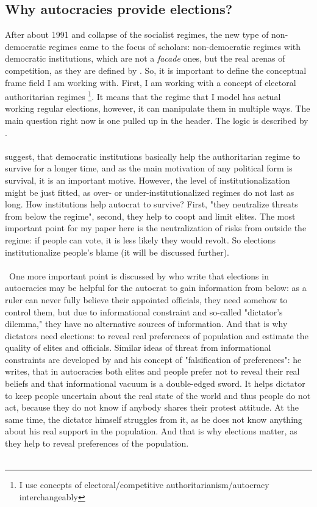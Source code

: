 \documentclass[a4paper, 12pt]{article}
\begin{document}
    \subsection*{Why autocracies provide elections?}
	After about 1991 and collapse of the socialist regimes, the new type of non-democratic regimes came to the focus of scholars: non-democratic regimes with democratic institutions, which are not a \textit{facade} ones, but the real arenas of competition, as they are defined by \cite{competition}. So, it is important to define the conceptual frame field I am working with. First, I am working with a concept of electoral authoritarian regimes \footnote{I use concepts of electoral/competitive authoritarianism/autocracy interchangeably}. It means that the regime that I model has actual working regular elections, however, it can manipulate them in multiple ways. The main question right now is one pulled up in the header. The logic is described by \cite{shedler}.\\\\
	\cite{institutions} suggest, that democratic institutions basically help the authoritarian regime to survive for a longer time, and as the main motivation of any political form is survival, it is an important motive. However, the level of institutionalization might be just fitted, as over- or under-institutionalized regimes do not last as long. How institutions help autocrat to survive? First, "they neutralize threats from below the regime", second, they help to coopt and limit elites. The most important point for my paper here is the neutralization of risks from outside the regime: if people can vote, it is less likely they would revolt. So elections institutionalize people's blame (it will be discussed further).\\\\\
	One more important point is discussed by \cite{parties_elections} who write that elections in autocracies may be helpful for the autocrat to gain information from below: as a ruler can never fully believe their appointed officials, they need somehow to control them, but due to informational constraint and so-called "dictator's dilemma," they have no alternative sources of information. And that is why dictators need elections: to reveal real preferences of population and estimate the quality of elites and officials. Similar ideas of threat from informational constraints are developed by \cite{Kuran} and his concept of "falsification of preferences": he writes, that in autocracies both elites and people prefer not to reveal their real beliefs and that informational vacuum is a double-edged sword. It helps dictator to keep people uncertain about the real state of the world and thus people do not act, because they do not know if anybody shares their protest attitude. At the same time, the dictator himself struggles from it, as he does not know anything about his real support in the population. And that is why elections matter, as they help to reveal preferences of the population.\\\\
\end{document}
